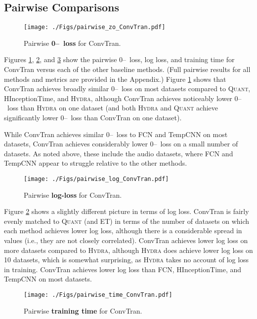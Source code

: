 \documentclass[twoside,11pt,preprint]{article}
\newcommand{\zo}{\mbox{0--\!1}~loss}
\newcommand{\quant}{\textsc{Quant}}
\newcommand{\hydra}{\textsc{Hydra}}
\begin{document}
\subsection{Pairwise Comparisons}

\begin{figure}%
    \centering%
    \texttt{[image: ./Figs/pairwise\_zo\_ConvTran.pdf]}%
    \caption{Pairwise \textbf{{\zo}} for ConvTran.}%
    \label{fig-pairwise-zo}%
\end{figure}%

Figures \ref{fig-pairwise-zo}, \ref{fig-pairwise-log}, and \ref{fig-pairwise-training-time} show the pairwise {\zo}, log loss, and training time for ConvTran versus each of the other baseline methods. (Full pairwise results for all methods and metrics are provided in the Appendix.)  Figure \ref{fig-pairwise-zo} shows that ConvTran achieves broadly similar {\zo} on most datasets compared to {\quant}, HInceptionTime, and {\hydra}, although ConvTran achieves noticeably lower {\zo} than {\hydra} on one dataset (and both {\hydra} and {\quant} achieve significantly lower {\zo} than ConvTran on one dataset).

While ConvTran achieves similar {\zo} to FCN and TempCNN on most datasets, ConvTran achieves considerably lower {\zo} on a small number of datasets. As noted above, these include the audio datasets, where FCN and TempCNN appear to struggle relative to the other methods.

\begin{figure}%
    \centering%
    \texttt{[image: ./Figs/pairwise\_log\_ConvTran.pdf]}%
    \caption{Pairwise \textbf{log-loss} for ConvTran.}%
    \label{fig-pairwise-log}%
\end{figure}%

Figure \ref{fig-pairwise-log} shows a slightly different picture in terms of log loss. ConvTran is fairly evenly matched to {\quant} (and ET) in terms of the number of datasets on which each method achieves lower log loss, although there is a considerable spread in values (i.e., they are not closely correlated). ConvTran achieves lower log loss on more datasets compared to {\hydra}, although {\hydra} does achieve lower log loss on 10 datasets, which is somewhat surprising, as {\hydra} takes no account of log loss in training. ConvTran achieves lower log loss than FCN, HInceptionTime, and TempCNN on most datasets.

\begin{figure}%
    \centering%
    \texttt{[image: ./Figs/pairwise\_time\_ConvTran.pdf]}%
    \caption{Pairwise \textbf{training time} for ConvTran.}%
    \label{fig-pairwise-training-time}%
\end{figure}%
\end{document}
